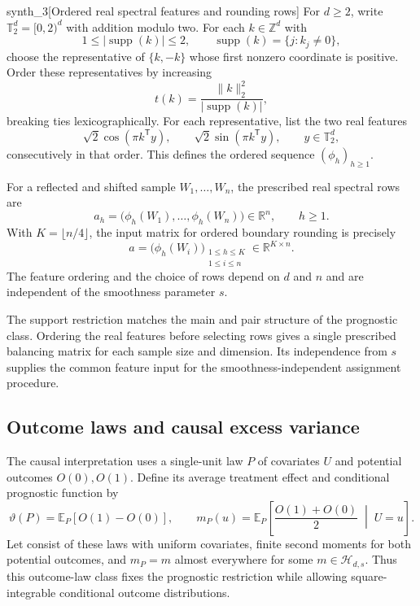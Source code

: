 \begin{definitionv}{synth_3}[Ordered real spectral features and rounding rows]
For \(d\geq2\), write \(\mathbb T_2^d=[0,2)^d\) with addition modulo two. For each \(k\in\mathbb Z^d\) with
\[
1\leq|\operatorname{supp}(k)|\leq2,
\qquad
\operatorname{supp}(k)=\{j:k_j\ne0\},
\]
choose the representative of \(\{k,-k\}\) whose first nonzero coordinate is positive. Order these representatives by increasing
\[
t(k)=\frac{\|k\|_2^2}{|\operatorname{supp}(k)|},
\]
breaking ties lexicographically. For each representative, list the two real features
\[
\sqrt2\cos(\pi k^{\mathsf T}y),
\qquad
\sqrt2\sin(\pi k^{\mathsf T}y),
\qquad y\in\mathbb T_2^d,
\]
consecutively in that order. This defines the ordered sequence \((\phi_h)_{h\geq1}\).

For a reflected and shifted sample \(W_1,\ldots,W_n\), the prescribed real spectral rows are
\[
a_h=\bigl(\phi_h(W_1),\ldots,\phi_h(W_n)\bigr)\in\mathbb R^n,
\qquad h\geq1.
\]
With \(K=\lfloor n/4\rfloor\), the input matrix for ordered boundary rounding is precisely
\[
a=\bigl(\phi_h(W_i)\bigr)_{\substack{1\leq h\leq K\\1\leq i\leq n}}
\in\mathbb R^{K\times n}.
\]
The feature ordering and the choice of rows depend on \(d\) and \(n\) and are independent of the smoothness parameter \(s\).
\end{definitionv}

The support restriction matches the main and pair structure of the prognostic class. Ordering the real features before selecting rows gives a single prescribed balancing matrix for each sample size and dimension. Its independence from \(s\) supplies the common feature input for the smoothness-independent assignment procedure.

\subsection{Outcome laws and causal excess variance}

The causal interpretation uses a single-unit law \(P\) of covariates \(U\) and potential outcomes \(O(0),O(1)\). Define its average treatment effect and conditional prognostic function by
\[
\vartheta(P)=\mathbb E_P[O(1)-O(0)],
\qquad
m_P(u)=
\mathbb E_P\!\left[
\frac{O(1)+O(0)}2\;\middle|\;U=u
\right].
\]
Let  consist of these laws with uniform covariates, finite second moments for both potential outcomes, and \(m_P=m\) almost everywhere for some \(m\in\mathcal H_{d,s}\). Thus this outcome-law class fixes the prognostic restriction while allowing square-integrable conditional outcome distributions.

